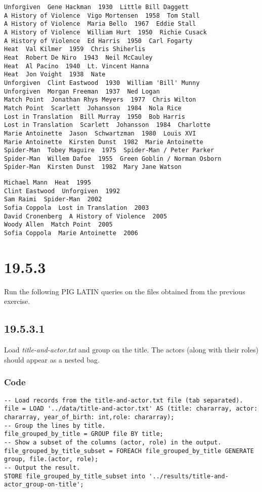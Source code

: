 \documentclass[a4paper, notitlepage]{article}
\begin{document}
\begin{lstlisting}
Unforgiven  Gene Hackman  1930  Little Bill Daggett
A History of Violence  Vigo Mortensen  1958  Tom Stall
A History of Violence  Maria Bello  1967  Eddie Stall
A History of Violence  William Hurt  1950  Richie Cusack
A History of Violence  Ed Harris  1950  Carl Fogarty
Heat  Val Kilmer  1959  Chris Shiherlis
Heat  Robert De Niro  1943  Neil McCauley
Heat  Al Pacino  1940  Lt. Vincent Hanna
Heat  Jon Voight  1938  Nate
Unforgiven  Clint Eastwood  1930  William 'Bill' Munny
Unforgiven  Morgan Freeman  1937  Ned Logan
Match Point  Jonathan Rhys Meyers  1977  Chris Wilton
Match Point  Scarlett  Johansson  1984  Nola Rice
Lost in Translation  Bill Murray  1950  Bob Harris
Lost in Translation  Scarlett  Johansson  1984  Charlotte
Marie Antoinette  Jason  Schwartzman  1980  Louis XVI
Marie Antoinette  Kirsten Dunst  1982  Marie Antoinette
Spider-Man  Tobey Maguire  1975  Spider-Man / Peter Parker
Spider-Man  Willem Dafoe  1955  Green Goblin / Norman Osborn
Spider-Man  Kirsten Dunst  1982  Mary Jane Watson
\end{lstlisting}

\begin{lstlisting}
Michael Mann  Heat  1995
Clint Eastwood  Unforgiven  1992
Sam Raimi  Spider-Man  2002
Sofia Coppola  Lost in Translation  2003
David Cronenberg  A History of Violence  2005
Woody Allen  Match Point  2005
Sofia Coppola  Marie Antoinette  2006
\end{lstlisting}

\section{19.5.3}

Run the following PIG LATIN queries on the files obtained from the previous exercise.

\subsection{19.5.3.1}

Load \textit{title-and-actor.txt} and group on the title. The actors (along with their roles) should appear as a nested bag.

\subsubsection{Code}

\begin{lstlisting}
-- Load records from the title-and-actor.txt file (tab separated).
file = LOAD '../data/title-and-actor.txt' AS (title: chararray, actor: chararray, year_of_birth: int,role: chararray);
-- Group the lines by title.
file_grouped_by_title = GROUP file BY title;
-- Show a subset of the columns (actor, role) in the output.
file_grouped_by_title_subset = FOREACH file_grouped_by_title GENERATE group, file.(actor, role);
-- Output the result.
STORE file_grouped_by_title_subset into '../results/title-and-actor_group-on-title';
\end{lstlisting}
\end{document}
